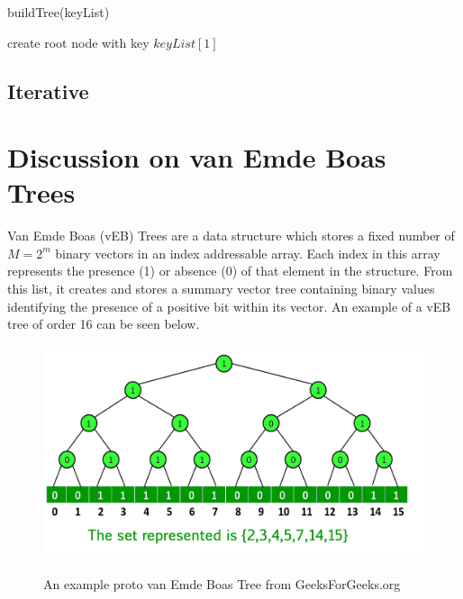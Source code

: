 \documentclass{article}
\begin{document}
        \begin{function}
            \caption{buildTree(keyList)}
            \DontPrintSemicolon


            create root node with key $keyList[1]$\;

        \end{function}

    \subsection*{Iterative}

\pagebreak

\section*{Discussion on van Emde Boas Trees}

Van Emde Boas (vEB) Trees are a data structure which stores a fixed number of ${M = 2^m}$ binary vectors in an index addressable array. Each index in this array represents the presence (1) or absence (0) of that element in the structure. From this list, it creates and stores a summary vector tree containing binary values identifying the presence of a positive bit within its vector. An example of a vEB tree of order 16 can be seen below.

\begin{figure}[h]
    \centering
    \includegraphics[width=\textwidth,keepaspectratio]{Images/vEB_tree_GFG.jpg}
    \label{fig: vEB}
    \caption{An example proto van Emde Boas Tree from GeeksForGeeks.org}
\end{figure}
\end{document}
